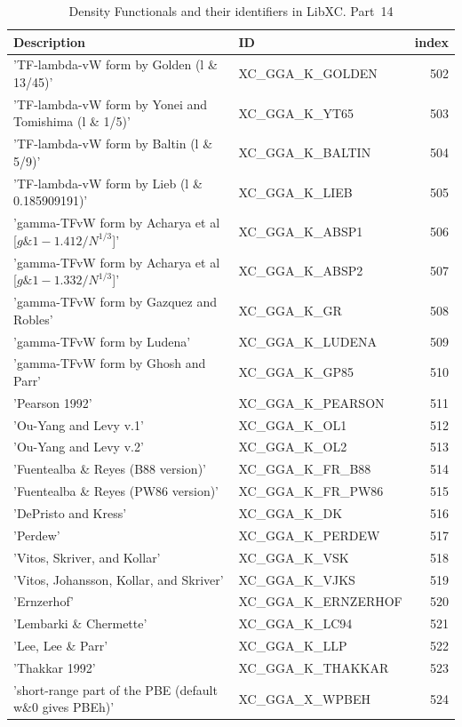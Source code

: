 \documentclass[final,12pt,makeidx,DIV=calc]{article}
\begin{document}
{{{\begin{table}[!h]
\caption{Density Functionals and their identifiers in LibXC. Part~14}
\begin{center}
\begin{tabular}{llr}
\hline
\hline
Description & ID & index\\
\hline
  'TF-lambda-vW form by Golden (l \& 13/45)' & XC\_GGA\_K\_GOLDEN  &502\\
  'TF-lambda-vW form by Yonei and Tomishima (l \& 1/5)' & XC\_GGA\_K\_YT65  &503\\
  'TF-lambda-vW form by Baltin (l \& 5/9)' & XC\_GGA\_K\_BALTIN  &504\\
  'TF-lambda-vW form by Lieb (l \& 0.185909191)' & XC\_GGA\_K\_LIEB  &505\\
  'gamma-TFvW form by Acharya et al [$g \& 1 - 1.412/N^{1/3}$]' & XC\_GGA\_K\_ABSP1  &506\\
  'gamma-TFvW form by Acharya et al [$g \& 1 - 1.332/N^{1/3}$]' & XC\_GGA\_K\_ABSP2  &507\\
  'gamma-TFvW form by Gazquez and Robles' & XC\_GGA\_K\_GR  &508\\
  'gamma-TFvW form by Ludena' & XC\_GGA\_K\_LUDENA  &509\\
  'gamma-TFvW form by Ghosh and Parr' & XC\_GGA\_K\_GP85  &510\\
  'Pearson 1992' & XC\_GGA\_K\_PEARSON  &511\\
  'Ou-Yang and Levy v.1' & XC\_GGA\_K\_OL1  &512\\
  'Ou-Yang and Levy v.2' & XC\_GGA\_K\_OL2  &513\\
  'Fuentealba \& Reyes (B88 version)' & XC\_GGA\_K\_FR\_B88  &514\\
  'Fuentealba \& Reyes (PW86 version)' & XC\_GGA\_K\_FR\_PW86  &515\\
  'DePristo and Kress' & XC\_GGA\_K\_DK  &516\\
  'Perdew' & XC\_GGA\_K\_PERDEW  &517\\
  'Vitos, Skriver, and Kollar' & XC\_GGA\_K\_VSK  &518\\
  'Vitos, Johansson, Kollar, and Skriver' & XC\_GGA\_K\_VJKS  &519\\
  'Ernzerhof' & XC\_GGA\_K\_ERNZERHOF  &520\\
  'Lembarki \& Chermette' & XC\_GGA\_K\_LC94  &521\\
  'Lee, Lee \& Parr' & XC\_GGA\_K\_LLP  &522\\
  'Thakkar 1992' & XC\_GGA\_K\_THAKKAR  &523\\
  'short-range part of the PBE (default w\&0 gives PBEh)' & XC\_GGA\_X\_WPBEH  &524\\

\end{tabular}
\end{center}
\end{table}}}}
\end{document}
